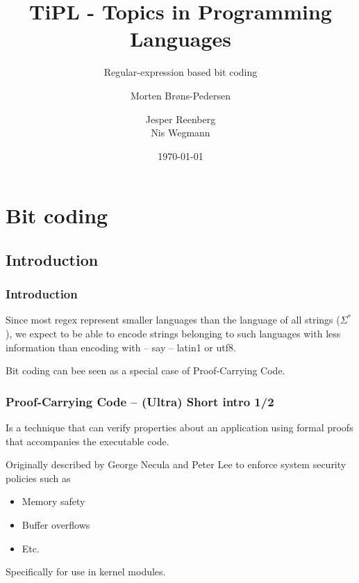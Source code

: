\documentclass[slidestop,compress,mathserif, xcolor=table]{beamer}
\title[]{TiPL - Topics in Programming Languages}
\subtitle{Regular-expression based bit coding}
\author[Morten Brøns-Pedersen \and Jesper Reenberg \and Nis Wegmann]
       {Morten Brøns-Pedersen \and
        Jesper Reenberg  \\
        Nis Wegmann }
\institute[DIKU]{Department of Computer Science}
\date[]{\today}
\begin{document}
\frame[plain]{\titlepage}

\section{Bit coding}

\subsection{Introduction}

\begin{frame}[c]
  \frametitle{Introduction}
     
  Since most regex represent smaller languages than the language of all strings
  ($\Sigma^\ast$), we expect to be able to encode strings belonging to such
  languages with less information than encoding with -- say -- latin1 or utf8. \newline

  \begin{block}{}
      Bit coding can bee seen as a special case of Proof-Carrying Code.
  \end{block}
  
\end{frame}

\begin{frame}
  \frametitle{Proof-Carrying Code -- (Ultra) Short intro 1/2}
  
  \begin{definition}[Weak]
    Is a technique that can verify properties about an application using formal
    proofs that accompanies the executable code.
  \end{definition}

  Originally described by George Necula and Peter Lee\cite{nele1996} to
  enforce system security policies such as

  \begin{itemize}
  \item Memory safety
  \item Buffer overflows
  \item Etc.
  \end{itemize}

  Specifically for use in kernel modules.

\end{frame}
\end{document}
